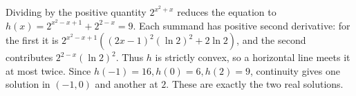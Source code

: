 Dividing by the positive quantity $2^{x^2+x}$ reduces the equation to $h(x)=2^{x^2-x+1}+2^{2-x}=9$. Each summand has positive second derivative: for the first it is $2^{x^2-x+1}((2x-1)^2(\ln2)^2+2\ln2)$, and the second contributes $2^{2-x}(\ln2)^2$. Thus $h$ is strictly convex, so a horizontal line meets it at most twice. Since $h(-1)=16,h(0)=6,h(2)=9$, continuity gives one solution in $(-1,0)$ and another at $2$. These are exactly the two real solutions.
